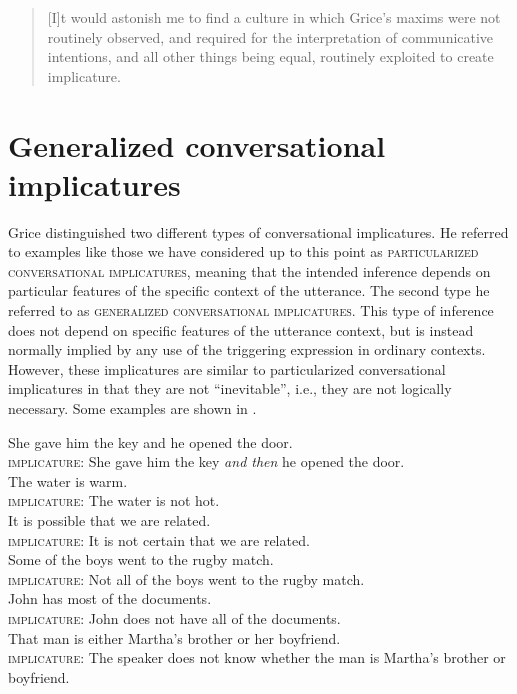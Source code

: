 \begin{quote}
[I]t would astonish me to find a culture in which Grice’s maxims were not routinely observed, and required for the interpretation of communicative intentions, and all other things being equal, routinely exploited to create implicature.
\end{quote}

\section{Generalized conversational implicatures}\label{sec:8.4}

Grice distinguished two different types of conversational implicatures. He referred to examples like those we have considered up to this point as \textsc{particularized conversational implicatures}, meaning that the intended inference depends on particular features of the specific context of the utterance. The second type he referred to as \textsc{generalized conversational implicatures}. This type of inference does not depend on specific features of the utterance context, but is instead normally implied by any use of the triggering expression in ordinary contexts. However, these implicatures are similar to particularized conversational implicatures in that they are not “inevitable”, i.e., they are not logically necessary. Some examples are shown in .


\ea \label{ex:8.14}
\ea  She gave him the key and he opened the door.\\
\textsc{implicature}: She gave him the key \textit{and then} he opened the door.\\
\ex  The water is warm.\\
\textsc{implicature}: The water is not hot.\\
\ex  It is possible that we are related.\\
\textsc{implicature}: It is not certain that we are related.\\
\ex  Some of the boys went to the rugby match.\\
\textsc{implicature}: Not all of the boys went to the rugby match.\\
\ex   John has most of the documents.\\
\textsc{implicature}: John does not have all of the documents.\\
\ex That man is either Martha’s brother or her boyfriend.\\
\textsc{implicature}: The speaker does not know whether the man is Martha’s brother or boyfriend.\\
\z \z


